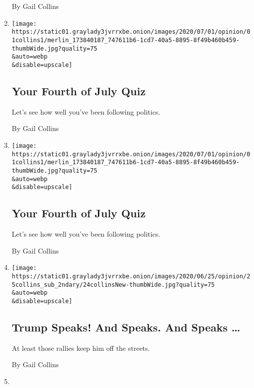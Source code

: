 \begin{enumerate}
  By Gail Collins
\item
  \href{/interactive/2020/07/01/opinion/4th-of-july-quiz.html}{}

  \texttt{[image: https://static01.graylady3jvrrxbe.onion/images/2020/07/01/opinion/01collins1/merlin\_173840187\_747611b6-1cd7-40a5-8895-8f49b460b459-thumbWide.jpg?quality=75\\\&auto=webp\\\&disable=upscale]}

  \hypertarget{your-fourth-of-july-quiz}{%
  \subsection{Your Fourth of July Quiz}\label{your-fourth-of-july-quiz}}

  Let's see how well you've been following politics.

  By Gail Collins
\item
  \href{/interactive/2020/07/01/opinion/4th-of-july-quiz.html}{}

  \texttt{[image: https://static01.graylady3jvrrxbe.onion/images/2020/07/01/opinion/01collins1/merlin\_173840187\_747611b6-1cd7-40a5-8895-8f49b460b459-thumbWide.jpg?quality=75\\\&auto=webp\\\&disable=upscale]}

  \hypertarget{your-fourth-of-july-quiz-1}{%
  \subsection{Your Fourth of July
  Quiz}\label{your-fourth-of-july-quiz-1}}

  Let's see how well you've been following politics.

  By Gail Collins
\item
  \href{/2020/06/24/opinion/trump-tulsa-2020.html}{}

  \texttt{[image: https://static01.graylady3jvrrxbe.onion/images/2020/06/25/opinion/25collins\_sub\_2ndary/24collinsNew-thumbWide.jpg?quality=75\\\&auto=webp\\\&disable=upscale]}

  \hypertarget{trump-speaks-and-speaks-and-speaks-}{%
  \subsection{Trump Speaks! And Speaks. And Speaks
  \ldots{}}\label{trump-speaks-and-speaks-and-speaks-}}

  At least those rallies keep him off the streets.

  By Gail Collins
\item
  \href{/2020/06/17/opinion/mitch-mcconnell-kentucky-senate.html}{}


\end{enumerate}
